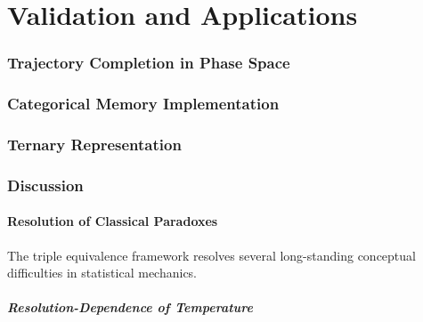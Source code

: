 \documentclass[twocolumn,10pt]{article}
\theoremstyle{plain}
\theoremstyle{definition}
\theoremstyle{remark}
\begin{document}



\part{Validation and Applications}
\label{part:validation}

\section{Trajectory Completion in Phase Space}
\label{sec:trajectory}



\section{Categorical Memory Implementation}
\label{sec:categorical_memory}



\section{Ternary Representation}
\label{sec:ternary}




\section{Discussion}
\label{sec:discussion}

\subsection{Resolution of Classical Paradoxes}

The triple equivalence framework resolves several long-standing conceptual difficulties in statistical mechanics.

\subsubsection{Resolution-Dependence of Temperature}
\end{document}
